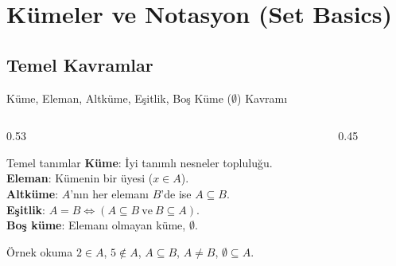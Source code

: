 \documentclass[light]{lutbeamer}
\begin{document}
\section{Kümeler ve Notasyon (Set Basics)}
\subsection{Temel Kavramlar}
\begin{frame}[fragile]{Küme, Eleman, Altküme, Eşitlik, Boş Küme ($\emptyset$) Kavramı}
    \begin{columns}[T]
        \begin{column}{0.53\textwidth}
            \begin{block}{Temel tanımlar}
                \textbf{Küme}: İyi tanımlı nesneler topluluğu. \\
                \textbf{Eleman}: Kümenin bir üyesi ($x \in A$). \\
                \textbf{Altküme}: $A$'nın her elemanı $B$'de ise $A \subseteq B$. \\
                \textbf{Eşitlik}: $A=B \iff (A\subseteq B \ \text{ve}\ B\subseteq A)$. \\
                \textbf{Boş küme}: Elemanı olmayan küme, $\emptyset$.
            \end{block}

            \begin{exampleblock}{Örnek okuma}
                $2\in A$, $5\notin A$, $A\subseteq B$, $A\neq B$, $\emptyset\subseteq A$.
            \end{exampleblock}
        \end{column}
        \begin{column}{0.45\textwidth}
            \centering
        \end{column}
    \end{columns}
\end{frame}
\end{document}

